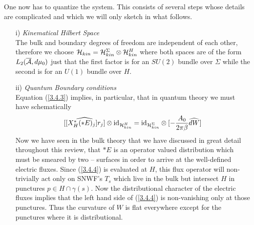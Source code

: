 \documentclass[12pt]{report}
\def\be{\begin{equation}}
\def\ee{\end{equation}}
\def\a{{\cal A}}
\def\ab{\overline{\a}}
\begin{document}
One now has to quantize the system. This consists of several steps whose 
details are complicated and which we will only sketch in what follows.
%
\begin{itemize}
%
\item[i)] {\it Kinematical Hilbert Space}\\
The bulk and boundary degrees of freedom are independent of each other,
therefore we choose ${\cal H}_{kin}={\cal H}^\Sigma_{kin}
\otimes {\cal H}^H_{kin}$ where both spaces are of the form  
$L_2(\ab,d\mu_0)$ just that the first factor is for an $SU(2)$ bundle
over $\Sigma$ while the second is for an $U(1)$ bundle over $H$. 
%
\item[ii)] {\it Quantum Boundary conditions}\\
Equation (\ref{3.4.3}) implies, in particular, that in quantum theory
we must have schematically
\be \label{3.4.4}
[\widehat{[X_H^\ast(\ast E)_j]r_j}]\otimes 
\mbox{id}_{{\cal H}^H_{kin}}=
\mbox{id}_{{\cal H}^\Sigma_{kin}}\otimes 
[-\frac{A_0}{2\pi\beta} \widehat{dW}]
\ee
Now we have seen in the bulk theory that we have discussed in great detail
throughout this review, that $\ast E$ is an operator valued distribution 
which must be smeared by two -- surfaces in order to arrive at the 
well-defined electric fluxes. Since (\ref{3.4.4}) is evaluated at 
$H$, this flux operator will non-trivially act only on SNWF's $T_s$ which 
live in the bulk 
but intersect $H$ in punctures $p\in H\cap \gamma(s)$. Now the 
distributional character of the electric fluxes implies that the left
hand side of (\ref{3.4.4}) is non-vanishing only at those punctures.
Thus the curvature of $W$ is flat everywhere except for the punctures 
where it is distributional. 


\end{itemize}
\end{document}
